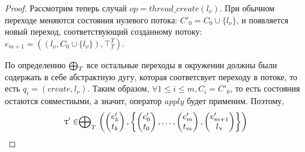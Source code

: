 \begin{proof}
Рассмотрим теперь случай $op = thread\_create(l_{\nu})$.
При обычном переходе меняются состояния нулевого потока: $C'_0 = C_0 \cup \{l_{\nu}\}$, и появляется новый переход, соответствующий созданному потоку: $e_{m+1} = ((l_{\nu},C_0 \cup \{l_{\nu}\}) , \top^T_T)$.

По определению $\mathrel{\bigoplus}_T$ все остальные переходы в окружении должны были содержать в себе абстрактную дугу, которая соответсвует переходу в потоке, то есть $q_i = (create, l_{\nu})$.
Таким образом, $\forall 1 \le i \le m, C_i = C'_0$, то есть состояния остаются совместными, а значит, оператор $apply$ будет применим.
Поэтому, 
$$\uptau' \in  \mathrel{\bigoplus}_{T}
\left(
\begin{pmatrix}
e'_k \\
t_k 
\end{pmatrix},
\left\{
\begin{pmatrix}
e'_0 \\
t_0 
\end{pmatrix},
\dots ,
\begin{pmatrix}
e'_m \\
t_m 
\end{pmatrix} ,
\begin{pmatrix}
e'_{m+1} \\
l_{\upnu} 
\end{pmatrix}
\right\}
\right)$$

\end{proof}


